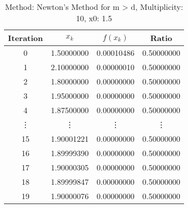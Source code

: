 \begin{table}
\centering
\caption{Method: Newton's Method for m > d, Multiplicity: 10, x0: 1.5}
\label{tab:table_Newton's_Method_for_m_>_d_10_1_5}
\begin{tabular}{c c c c}
\toprule
Iteration &      $x_k$ &   $f(x_k)$ &      Ratio \\
\midrule
        0 & 1.50000000 & 0.00010486 & 0.50000000 \\
        1 & 2.10000000 & 0.00000010 & 0.50000000 \\
        2 & 1.80000000 & 0.00000000 & 0.50000000 \\
        3 & 1.95000000 & 0.00000000 & 0.50000000 \\
        4 & 1.87500000 & 0.00000000 & 0.50000000 \\
   \vdots &     \vdots &     \vdots &     \vdots \\
       15 & 1.90001221 & 0.00000000 & 0.50000000 \\
       16 & 1.89999390 & 0.00000000 & 0.50000000 \\
       17 & 1.90000305 & 0.00000000 & 0.50000000 \\
       18 & 1.89999847 & 0.00000000 & 0.50000000 \\
       19 & 1.90000076 & 0.00000000 & 0.50000000 \\
\bottomrule
\end{tabular}
\end{table}
